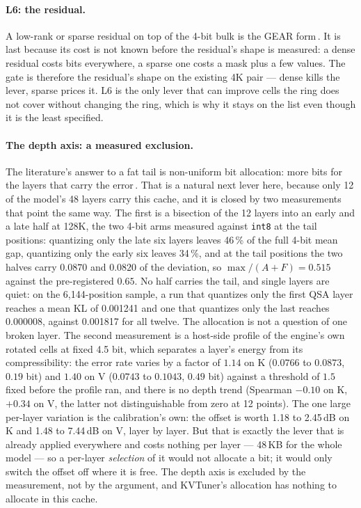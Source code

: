 \documentclass[10pt,twocolumn]{article}
\begin{document}
\paragraph{L6: the residual.} A low-rank or sparse residual on top of the 4-bit bulk is the GEAR form\,\cite{gear}. It is last because its cost is not known before the residual's shape is measured: a dense residual costs bits everywhere, a sparse one costs a mask plus a few values. The gate is therefore the residual's shape on the existing 4K pair --- dense kills the lever, sparse prices it. L6 is the only lever that can improve cells the ring does not cover without changing the ring, which is why it stays on the list even though it is the least specified.

\paragraph{The depth axis: a measured exclusion.} The literature's answer to a fat tail is non-uniform bit allocation: more bits for the layers that carry the error\,\cite{kvtuner}. That is a natural next lever here, because only 12 of the model's 48 layers carry this cache, and it is closed by two measurements that point the same way. The first is a bisection of the 12 layers into an early and a late half at 128K, the two 4-bit arms measured against \texttt{int8} at the tail positions: quantizing only the late six layers leaves 46\,\% of the full 4-bit mean gap, quantizing only the early six leaves 34\,\%, and at the tail positions the two halves carry $0.0870$ and $0.0820$ of the deviation, so $\max/(A+F) = 0.515$ against the pre-registered $0.65$. No half carries the tail, and single layers are quiet: on the 6,144-position sample, a run that quantizes only the first QSA layer reaches a mean KL of 0.001241 and one that quantizes only the last reaches 0.000008, against 0.001817 for all twelve. The allocation is not a question of one broken layer. The second measurement is a host-side profile of the engine's own rotated cells at fixed 4.5 bit, which separates a layer's energy from its compressibility: the error rate varies by a factor of $1.14$ on K ($0.0766$ to $0.0873$, $0.19$ bit) and $1.40$ on V ($0.0743$ to $0.1043$, $0.49$ bit) against a threshold of $1.5$ fixed before the profile ran, and there is no depth trend (Spearman $-0.10$ on K, $+0.34$ on V, the latter not distinguishable from zero at 12 points). The one large per-layer variation is the calibration's own: the offset is worth 1.18 to 2.45\,dB on K and 1.48 to 7.44\,dB on V, layer by layer. But that is exactly the lever that is already applied everywhere and costs nothing per layer --- 48\,KB for the whole model --- so a per-layer \emph{selection} of it would not allocate a bit; it would only switch the offset off where it is free. The depth axis is excluded by the measurement, not by the argument, and KVTuner's allocation has nothing to allocate in this cache.
\end{document}
